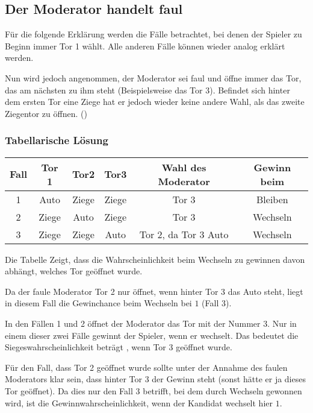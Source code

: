 \subsection{Der Moderator handelt faul}

Für die folgende Erklärung werden die Fälle betrachtet, bei denen der Spieler zu Beginn immer Tor 1 wählt. Alle anderen Fälle können wieder analog erklärt werden.

Nun wird jedoch angenommen, der Moderator sei faul und öffne immer das Tor, das am nächsten zu ihm steht (Beispielsweise das Tor 3). Befindet sich hinter dem ersten Tor eine Ziege hat er jedoch wieder keine andere Wahl, als das zweite Ziegentor zu öffnen. (\cite{Rosenthal:2008})

\subsubsection{Tabellarische Lösung}

\begin{tabular}[h]{|c|c|c|c|c|c|}
    \hline
    \textbf{Fall} & \textbf{Tor 1} & \textbf{Tor2} & \textbf{Tor3} & \textbf{Wahl des Moderator} & \textbf{Gewinn beim} \\
    \hline
    1             & Auto           & Ziege         & Ziege         & Tor 3                       & Bleiben              \\
    2             & Ziege          & Auto          & Ziege         & Tor 3                       & Wechseln             \\
    3             & Ziege          & Ziege         & Auto          & Tor 2, da Tor 3 Auto        & Wechseln             \\
    \hline
\end{tabular}

Die Tabelle Zeigt, dass die Wahrscheinlichkeit beim Wechseln zu gewinnen davon abhängt, welches Tor geöffnet wurde.

Da der faule Moderator Tor 2 nur öffnet, wenn hinter Tor 3 das Auto steht, liegt in diesem Fall die Gewinchance beim Wechseln bei $1$ (Fall 3).

In den Fällen 1 und 2 öffnet der Moderator das Tor mit der Nummer 3. Nur in einem dieser zwei Fälle gewinnt der Spieler, wenn er wechselt. Das bedeutet die Siegeswahrscheinlichkeit beträgt , wenn Tor 3 geöffnet wurde.

Für den Fall, dass Tor 2 geöffnet wurde sollte unter der Annahme des faulen Moderators klar sein, dass hinter Tor 3 der Gewinn steht (sonst hätte er ja dieses Tor geöffnet). Da dies nur den Fall 3 betrifft, bei dem durch Wechseln gewonnen wird, ist die Gewinnwahrscheinlichkeit, wenn der Kandidat wechselt hier $1$.

